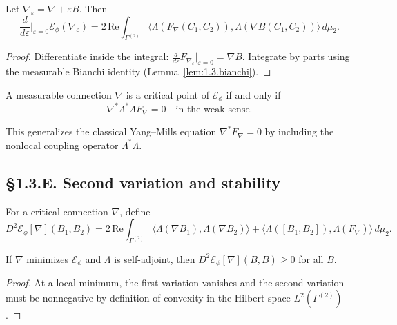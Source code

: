 \begin{theorem}\label{thm:1.3.variation}
Let $\nabla_\varepsilon=\nabla+\varepsilon B$. Then
\[
\frac{d}{d\varepsilon}\Big|_{\varepsilon=0} \mathcal{E}_\phi(\nabla_\varepsilon)
 = 2\,\mathrm{Re}\int_{\Gamma^{(2)}} 
    \langle \Lambda(F_\nabla(C_1,C_2)), 
    \Lambda(\nabla B(C_1,C_2)) \rangle\,d\mu_2.
\]
\end{theorem}

\begin{proof}
Differentiate inside the integral: $\frac{d}{d\varepsilon}F_{\nabla_\varepsilon}|_{\varepsilon=0}=\nabla B$. 
Integrate by parts using the measurable Bianchi identity (Lemma~\ref{lem:1.3.bianchi}).
\end{proof}

\begin{corollary}
A measurable connection $\nabla$ is a critical point of $\mathcal{E}_\phi$ if and only if
\[
\nabla^\ast \Lambda^\ast \Lambda F_\nabla = 0
\quad \text{in the weak sense.}
\]
\end{corollary}

\begin{remark}
This generalizes the classical Yang–Mills equation $\nabla^\ast F_\nabla=0$ by including the nonlocal coupling operator $\Lambda^\ast\Lambda$.
\end{remark}

\subsection*{§1.3.E. Second variation and stability}

\begin{definition}
For a critical connection $\nabla$, define
\[
D^2\mathcal{E}_\phi[\nabla](B_1,B_2)
  =2\,\mathrm{Re}\int_{\Gamma^{(2)}} 
  \langle \Lambda(\nabla B_1),\Lambda(\nabla B_2)\rangle
  +\langle \Lambda([B_1,B_2]),\Lambda(F_\nabla)\rangle\,d\mu_2.
\]
\end{definition}

\begin{lemma}\label{lem:1.3.pos}
If $\nabla$ minimizes $\mathcal E_\phi$ and $\Lambda$ is self-adjoint, then $D^2\mathcal{E}_\phi[\nabla](B,B)\ge0$ for all $B$.
\end{lemma}

\begin{proof}
At a local minimum, the first variation vanishes and the second variation must be nonnegative by definition of convexity in the Hilbert space $L^2(\Gamma^{(2)})$.
\end{proof}

